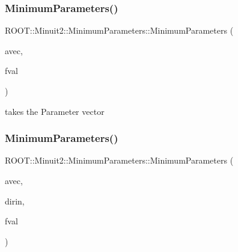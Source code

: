 \mbox{\label{classROOT_1_1Minuit2_1_1MinimumParameters_a72fd528946a07bcf3e320c0505953aa8}} 
\subsubsection{\texorpdfstring{MinimumParameters()}{MinimumParameters()}\hspace{0.1cm}{\footnotesize\ttfamily [6/12]}}
{\footnotesize\ttfamily R\+O\+O\+T\+::\+Minuit2\+::\+Minimum\+Parameters\+::\+Minimum\+Parameters (\begin{DoxyParamCaption}\item[{const \mbox{\hyperlink{namespaceROOT_1_1Minuit2_a62ed97730a1ca8d3fbaec64a19aa11c9}{Mn\+Algebraic\+Vector}} \&}]{avec,  }\item[{double}]{fval }\end{DoxyParamCaption})\hspace{0.3cm}{\ttfamily [inline]}}

takes the Parameter vector \mbox{\label{classROOT_1_1Minuit2_1_1MinimumParameters_ad771c737e802f1f6a6f01b94dd249ef7}} 
\subsubsection{\texorpdfstring{MinimumParameters()}{MinimumParameters()}\hspace{0.1cm}{\footnotesize\ttfamily [7/12]}}
{\footnotesize\ttfamily R\+O\+O\+T\+::\+Minuit2\+::\+Minimum\+Parameters\+::\+Minimum\+Parameters (\begin{DoxyParamCaption}\item[{const \mbox{\hyperlink{namespaceROOT_1_1Minuit2_a62ed97730a1ca8d3fbaec64a19aa11c9}{Mn\+Algebraic\+Vector}} \&}]{avec,  }\item[{const \mbox{\hyperlink{namespaceROOT_1_1Minuit2_a62ed97730a1ca8d3fbaec64a19aa11c9}{Mn\+Algebraic\+Vector}} \&}]{dirin,  }\item[{double}]{fval }\end{DoxyParamCaption})\hspace{0.3cm}{\ttfamily [inline]}}

